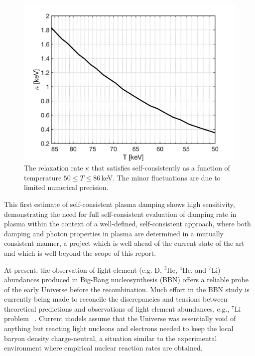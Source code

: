 \begin{figure} 
\centerline{
\includegraphics[width=0.9\linewidth]{./plots/OverdampingKappa.jpg}}
\caption{The relaxation rate $\kappa$ that satisfies  self-consistently as a function of temperature $50\leqslant T\leqslant 86$\,keV. The minor fluctuations are due to limited numerical precision. }
\label{KappaSol:fig} 
\end{figure}

This first estimate of self-consistent plasma damping shows high sensitivity, demonstrating the need for full self-consistent evaluation of damping rate in plasma within the context of a well-defined, self-consistent approach, where both damping and photon properties in plasma are determined in a mutually consistent manner, a project which is well ahead of the current state of the art and which is well beyond the scope of this report.  

\label{sec:Discussion}
At present, the observation of light element (e.g. D, $^3$He, $^4$He, and $^7$Li) abundances produced in Big-Bang nucleosynthesis (BBN) offers a reliable probe of the early Universe before the recombination. Much effort in the BBN study is currently being made to reconcile the discrepancies and tensions between theoretical predictions and observations of light element abundances, e.g., $^7$Li problem ~\cite{Pitrou:2018cgg}.
Current models assume that the Universe was essentially void of anything but reacting light nucleons and electrons needed to keep the local baryon density charge-neutral, a situation similar to the experimental environment where empirical nuclear reaction rates are obtained.

